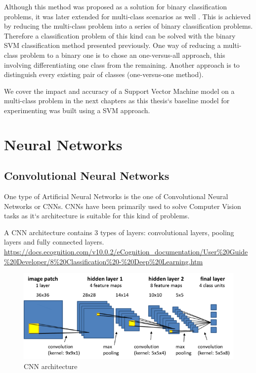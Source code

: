 \documentclass[12pt,a4paper]{report}
\begin{document}
Although this method was proposed as a solution for binary classification problems, it was later extended for multi-class scenarios as well \citep{duan2005best}. This is achieved by reducing the multi-class problem into a series of binary classification problems. Therefore a classification problem of this kind can be solved with the binary SVM classification method presented previously. One way of reducing a multi-class problem to a binary one is to chose an one-versus-all approach, this involving differentiating one class from the remaining. Another approach is to distinguish every existing pair of classes (one-versus-one method).

We cover the impact and accuracy of a Support Vector Machine model on a multi-class problem in the next chapters as this thesis`s baseline model for experimenting was built using a SVM approach.

\section{Neural Networks}

\subsection{Convolutional Neural Networks}
One type of Artificial Neural Networks is the one of Convolutional Neural Networks or CNNs. CNNs have been primarily used to solve Computer Vision tasks as it`s architecture is suitable for this kind of problems.

A CNN architecture contains 3 types of layers: convolutional layers, pooling layers and fully connected layers.
\urldef{\urlCNN}\url{https://docs.ecognition.com/v10.0.2/eCognition_documentation/User%20Guide%20Developer/8%20Classification%20-%20Deep%20Learning.htm}
\begin{figure}[H]
\centering
\includegraphics[width=15cm]{pics/cnn.png}
  \caption[CNN architecture]{CNN architecture\footnotemark}
  \label{fig:CNN}
\end{figure}
\footnotetext{\urlCNN}
\end{document}
